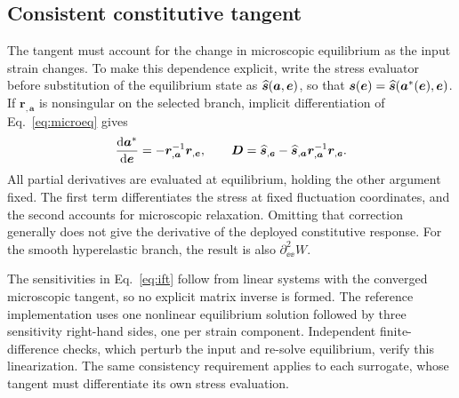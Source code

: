 \subsection{Consistent constitutive tangent}
The tangent must account for the change in microscopic equilibrium as the input strain changes. To make this dependence explicit, write the stress evaluator before substitution of the equilibrium state as $\widehat{\bm s}(\bm a,\bm e)$, so that $\bm s(\bm e)=\widehat{\bm s}(\bm a^*(\bm e),\bm e)$. If $\bm r_{,\bm a}$ is nonsingular on the selected branch, implicit differentiation of Eq.~\eqref{eq:microeq} gives
\begin{equation}
 \frac{\mathrm d\bm a^*}{\mathrm d\bm e}=-\bm r_{,\bm a}^{-1}\bm r_{,\bm e},\qquad
 \bm D=\widehat{\bm s}_{,\bm e}
       -\widehat{\bm s}_{,\bm a}\bm r_{,\bm a}^{-1}\bm r_{,\bm e}.
 \label{eq:ift}
\end{equation}
All partial derivatives are evaluated at equilibrium, holding the other argument fixed. The first term differentiates the stress at fixed fluctuation coordinates, and the second accounts for microscopic relaxation. Omitting that correction generally does not give the derivative of the deployed constitutive response. For the smooth hyperelastic branch, the result is also $\partial^2_{\ee\ee}W$.

The sensitivities in Eq.~\eqref{eq:ift} follow from linear systems with the converged microscopic tangent, so no explicit matrix inverse is formed. The reference implementation uses one nonlinear equilibrium solution followed by three sensitivity right-hand sides, one per strain component. Independent finite-difference checks, which perturb the input and re-solve equilibrium, verify this linearization. The same consistency requirement applies to each surrogate, whose tangent must differentiate its own stress evaluation.

